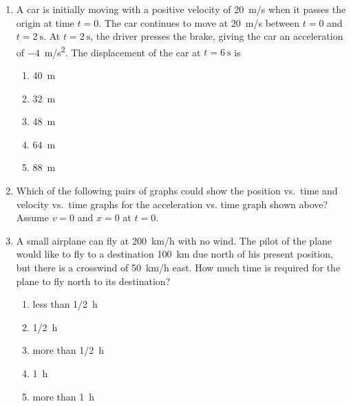 \documentclass{../../oss-apphys}
\begin{document}
\begin{multicols}{2}
\begin{enumerate}[resume,leftmargin=18pt]
  \item A car is initially moving with a positive velocity of \SI{20}{m/s} when
    it passes the origin at time $t=0$. The car continues to move at
    \SI{20}{m/s} between $t=0$ and $t=\SI{2}{\second}$. At $t=\SI{2}{\second}$, the driver
    presses the brake, giving the car an acceleration of \SI{-4}{m/s^2}. The
    displacement of the car at $t=\SI{6}{\second}$ is
    \begin{enumerate}[noitemsep,topsep=0pt,leftmargin=18pt,label=(\Alph*)]
    \item\SI{40}{\metre}
    \item\SI{32}{\metre}
    \item\SI{48}{\metre}
    \item\SI{64}{\metre}
    \item\SI{88}{\metre}
    \end{enumerate}
    \columnbreak
    
  \item Which of the following pairs of graphs could show the position vs.\
    time and velocity vs.\ time graphs for the acceleration vs. time graph
    shown above? Assume $v=0$ and $x=0$ at $t=0$.
    \begin{center}
    \end{center}
    
  \item A small airplane can fly at \SI{200}{km/h} with no wind. The pilot of
    the plane would like to fly to a destination \SI{100}{km} due north of his
    present position, but there is a crosswind of \SI{50}{km/h} east. How much
    time is required for the plane to fly north to its destination?
    \begin{enumerate}[noitemsep,topsep=0pt,leftmargin=18pt,label=(\Alph*)]
    \item less than \SI{1/2}{\hour}
    \item \SI{1/2}{\hour}
    \item more than \SI{1/2}{\hour}
    \item \SI{1}{\hour}
    \item more than \SI{1}{\hour}
    \end{enumerate}
    \columnbreak
    

\end{enumerate}
\end{multicols}
\end{document}
